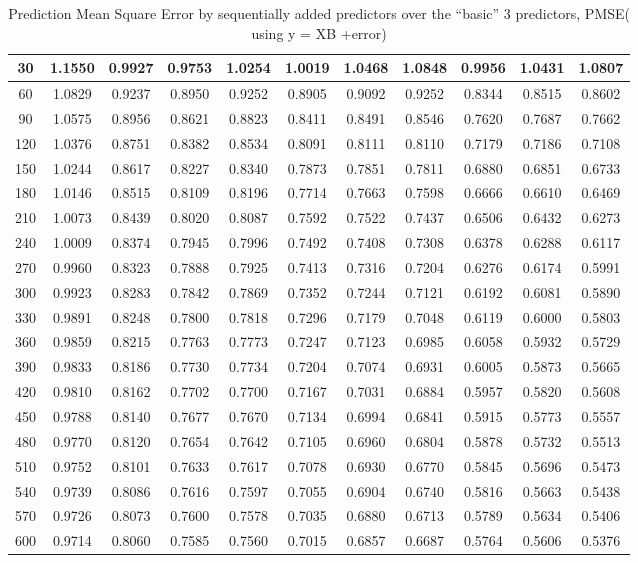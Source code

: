 \documentclass[12pt]{report}
\begin{document}
\begin{table}[h!]
{\begin{tabular}{||c c c c c c c c c c c||}
30 & 1.1550 & 0.9927 & 0.9753 & 1.0254 & 1.0019 & 1.0468 & 1.0848 & 0.9956 & 1.0431 & 1.0807 \\ \hline
        60 & 1.0829 & 0.9237 & 0.8950 & 0.9252 & 0.8905 & 0.9092 & 0.9252 & 0.8344 & 0.8515 & 0.8602 \\ \hline
        90 & 1.0575 & 0.8956 & 0.8621 & 0.8823 & 0.8411 & 0.8491 & 0.8546 & 0.7620 & 0.7687 & 0.7662 \\ \hline
        120 & 1.0376 & 0.8751 & 0.8382 & 0.8534 & 0.8091 & 0.8111 & 0.8110 & 0.7179 & 0.7186 & 0.7108 \\ \hline
        150 & 1.0244 & 0.8617 & 0.8227 & 0.8340 & 0.7873 & 0.7851 & 0.7811 & 0.6880 & 0.6851 & 0.6733 \\ \hline
        180 & 1.0146 & 0.8515 & 0.8109 & 0.8196 & 0.7714 & 0.7663 & 0.7598 & 0.6666 & 0.6610 & 0.6469 \\ \hline
        210 & 1.0073 & 0.8439 & 0.8020 & 0.8087 & 0.7592 & 0.7522 & 0.7437 & 0.6506 & 0.6432 & 0.6273 \\ \hline
        240 & 1.0009 & 0.8374 & 0.7945 & 0.7996 & 0.7492 & 0.7408 & 0.7308 & 0.6378 & 0.6288 & 0.6117 \\ \hline
        270 & 0.9960 & 0.8323 & 0.7888 & 0.7925 & 0.7413 & 0.7316 & 0.7204 & 0.6276 & 0.6174 & 0.5991 \\ \hline
        300 & 0.9923 & 0.8283 & 0.7842 & 0.7869 & 0.7352 & 0.7244 & 0.7121 & 0.6192 & 0.6081 & 0.5890 \\ \hline
        330 & 0.9891 & 0.8248 & 0.7800 & 0.7818 & 0.7296 & 0.7179 & 0.7048 & 0.6119 & 0.6000 & 0.5803 \\ \hline
        360 & 0.9859 & 0.8215 & 0.7763 & 0.7773 & 0.7247 & 0.7123 & 0.6985 & 0.6058 & 0.5932 & 0.5729 \\ \hline
        390 & 0.9833 & 0.8186 & 0.7730 & 0.7734 & 0.7204 & 0.7074 & 0.6931 & 0.6005 & 0.5873 & 0.5665 \\ \hline
        420 & 0.9810 & 0.8162 & 0.7702 & 0.7700 & 0.7167 & 0.7031 & 0.6884 & 0.5957 & 0.5820 & 0.5608 \\ \hline
        450 & 0.9788 & 0.8140 & 0.7677 & 0.7670 & 0.7134 & 0.6994 & 0.6841 & 0.5915 & 0.5773 & 0.5557 \\ \hline
        480 & 0.9770 & 0.8120 & 0.7654 & 0.7642 & 0.7105 & 0.6960 & 0.6804 & 0.5878 & 0.5732 & 0.5513 \\ \hline
        510 & 0.9752 & 0.8101 & 0.7633 & 0.7617 & 0.7078 & 0.6930 & 0.6770 & 0.5845 & 0.5696 & 0.5473 \\ \hline
        540 & 0.9739 & 0.8086 & 0.7616 & 0.7597 & 0.7055 & 0.6904 & 0.6740 & 0.5816 & 0.5663 & 0.5438 \\ \hline
        570 & 0.9726 & 0.8073 & 0.7600 & 0.7578 & 0.7035 & 0.6880 & 0.6713 & 0.5789 & 0.5634 & 0.5406 \\ \hline
        600 & 0.9714 & 0.8060 & 0.7585 & 0.7560 & 0.7015 & 0.6857 & 0.6687 & 0.5764 & 0.5606 & 0.5376 \\ \hline
\end{tabular}}
\caption{Prediction Mean Square Error by sequentially added predictors over the “basic” 3 predictors, PMSE( using y = XB +error)}
\label{table:PMSElinear}
\end{table}
\end{document}
